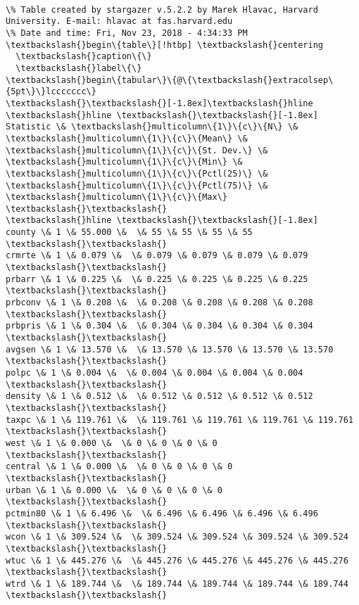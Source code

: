 \documentclass[11pt]{article}
\begin{document}
    \begin{Verbatim}[commandchars=\\\{\}]

\% Table created by stargazer v.5.2.2 by Marek Hlavac, Harvard University. E-mail: hlavac at fas.harvard.edu
\% Date and time: Fri, Nov 23, 2018 - 4:34:33 PM
\textbackslash{}begin\{table\}[!htbp] \textbackslash{}centering 
  \textbackslash{}caption\{\} 
  \textbackslash{}label\{\} 
\textbackslash{}begin\{tabular\}\{@\{\textbackslash{}extracolsep\{5pt\}\}lccccccc\} 
\textbackslash{}\textbackslash{}[-1.8ex]\textbackslash{}hline 
\textbackslash{}hline \textbackslash{}\textbackslash{}[-1.8ex] 
Statistic \& \textbackslash{}multicolumn\{1\}\{c\}\{N\} \& \textbackslash{}multicolumn\{1\}\{c\}\{Mean\} \& \textbackslash{}multicolumn\{1\}\{c\}\{St. Dev.\} \& \textbackslash{}multicolumn\{1\}\{c\}\{Min\} \& \textbackslash{}multicolumn\{1\}\{c\}\{Pctl(25)\} \& \textbackslash{}multicolumn\{1\}\{c\}\{Pctl(75)\} \& \textbackslash{}multicolumn\{1\}\{c\}\{Max\} \textbackslash{}\textbackslash{} 
\textbackslash{}hline \textbackslash{}\textbackslash{}[-1.8ex] 
county \& 1 \& 55.000 \&  \& 55 \& 55 \& 55 \& 55 \textbackslash{}\textbackslash{} 
crmrte \& 1 \& 0.079 \&  \& 0.079 \& 0.079 \& 0.079 \& 0.079 \textbackslash{}\textbackslash{} 
prbarr \& 1 \& 0.225 \&  \& 0.225 \& 0.225 \& 0.225 \& 0.225 \textbackslash{}\textbackslash{} 
prbconv \& 1 \& 0.208 \&  \& 0.208 \& 0.208 \& 0.208 \& 0.208 \textbackslash{}\textbackslash{} 
prbpris \& 1 \& 0.304 \&  \& 0.304 \& 0.304 \& 0.304 \& 0.304 \textbackslash{}\textbackslash{} 
avgsen \& 1 \& 13.570 \&  \& 13.570 \& 13.570 \& 13.570 \& 13.570 \textbackslash{}\textbackslash{} 
polpc \& 1 \& 0.004 \&  \& 0.004 \& 0.004 \& 0.004 \& 0.004 \textbackslash{}\textbackslash{} 
density \& 1 \& 0.512 \&  \& 0.512 \& 0.512 \& 0.512 \& 0.512 \textbackslash{}\textbackslash{} 
taxpc \& 1 \& 119.761 \&  \& 119.761 \& 119.761 \& 119.761 \& 119.761 \textbackslash{}\textbackslash{} 
west \& 1 \& 0.000 \&  \& 0 \& 0 \& 0 \& 0 \textbackslash{}\textbackslash{} 
central \& 1 \& 0.000 \&  \& 0 \& 0 \& 0 \& 0 \textbackslash{}\textbackslash{} 
urban \& 1 \& 0.000 \&  \& 0 \& 0 \& 0 \& 0 \textbackslash{}\textbackslash{} 
pctmin80 \& 1 \& 6.496 \&  \& 6.496 \& 6.496 \& 6.496 \& 6.496 \textbackslash{}\textbackslash{} 
wcon \& 1 \& 309.524 \&  \& 309.524 \& 309.524 \& 309.524 \& 309.524 \textbackslash{}\textbackslash{} 
wtuc \& 1 \& 445.276 \&  \& 445.276 \& 445.276 \& 445.276 \& 445.276 \textbackslash{}\textbackslash{} 
wtrd \& 1 \& 189.744 \&  \& 189.744 \& 189.744 \& 189.744 \& 189.744 \textbackslash{}\textbackslash{} 

\end{Verbatim}
\end{document}
